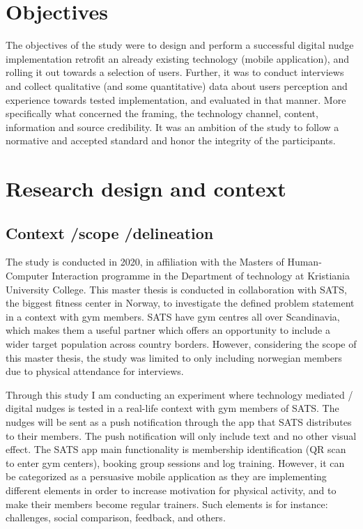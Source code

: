 \section{Objectives}
The objectives of the study were to design and perform a successful digital nudge implementation retrofit an already existing technology (mobile application), and rolling it out towards a selection of users.
Further, it was to conduct interviews and collect qualitative (and some quantitative) data about users perception and experience towards tested implementation, and evaluated in that manner. More specifically what concerned the framing, the technology channel, content, information and source credibility. It was an ambition of the study to follow a normative and accepted standard and honor the integrity of the participants. 

\section{Research design and context}
\subsection{Context /scope /delineation }

The study is conducted in 2020, in affiliation with the Masters of Human-Computer Interaction programme in the Department of technology at Kristiania University College. This master thesis is conducted in collaboration with SATS, the biggest fitness center in Norway, to investigate the defined problem statement in a context with gym members. SATS have gym centres all over Scandinavia, which makes them a useful partner which offers an opportunity to include a wider target population across country borders. However, considering the scope of this master thesis, the study was limited to only including norwegian members due to physical attendance for interviews. 

Through this study I am conducting an experiment where technology mediated / digital nudges is tested in a real-life context with gym members of SATS. The nudges will be sent as a push notification through the app that SATS distributes to their members. The push notification will only include text and no other visual effect. The SATS app main functionality is membership identification (QR scan to enter gym centers), booking group sessions and log training. However, it can be categorized as a persuasive mobile application as they are implementing different elements in order to increase motivation for physical activity, and to make their members become regular trainers. Such elements is for instance: challenges, social comparison, feedback, and others. 

